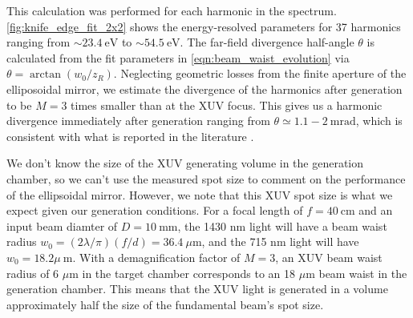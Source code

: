 This calculation was performed for each harmonic in the spectrum. \cref{fig:knife_edge_fit_2x2} shows the energy-resolved parameters for 37 harmonics ranging from $\sim 23.4 \ \textrm{eV}$ to $\sim 54.5 \ \textrm{eV}$. The far-field divergence half-angle $\theta$ is calculated from the fit parameters in \cref{eqn:beam_waist_evolution} via $\theta = \arctan(w_0 / z_R)$. Neglecting geometric losses from the finite aperture of the elliposoidal mirror, we estimate the divergence of the harmonics after generation to be $M = 3$ times smaller than at the XUV focus. This gives us a harmonic divergence immediately after generation ranging from $\theta \simeq 1.1 - 2 \ \textrm{mrad}$, which is consistent with what is reported in the literature \cite{tischAngularlyResolvedHighorder1994}.

We don't know the size of the XUV generating volume in the generation chamber, so we can't use the measured spot size to comment on the performance of the ellipsoidal mirror. However, we note that this XUV spot size is what we expect given our generation conditions. For a focal length of $f = 40 \ \textrm{cm}$ and an input beam diamter of $D = 10 \ \textrm{mm}$, the 1430 nm light will have a beam waist radius $w_0 = (2 \lambda / \pi)(f/d) = 36.4 \ \mu \textrm{m}$, and the 715 nm light will have $w_0 = 18.2 \mu \ \textrm{m}$. With a demagnification factor of $M=3$, an XUV beam waist radius of 6 $\mu$m in the target chamber corresponds to an 18 $\mu$m beam waist in the generation chamber. This means that the XUV light is generated in a volume approximately half the size of the fundamental beam's spot size.





